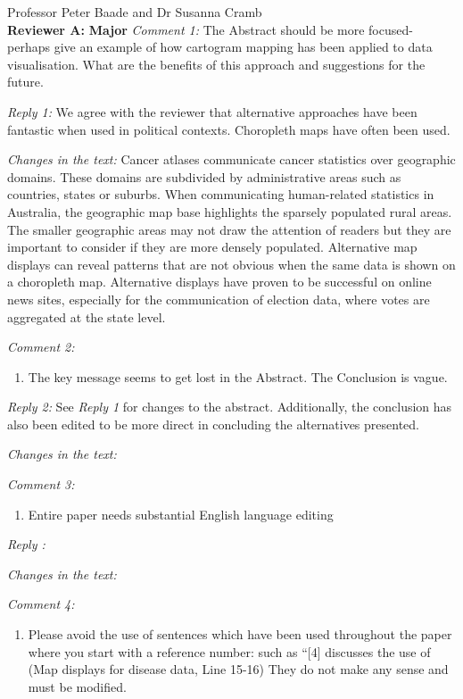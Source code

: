 \documentclass[11pt,a4paper,]{letter}
\providecommand{\tightlist}{%
  \setlength{\itemsep}{0pt}\setlength{\parskip}{0pt}}
\begin{document}
\begin{letter}{Professor Peter Baade and Dr Susanna Cramb\\}
\textbf{Reviewer A: }
\textbf{Major}
\emph{Comment 1: }
The Abstract should be more focused- perhaps give an example of how cartogram mapping has been applied to data visualisation. What are the benefits of this approach and suggestions for the future.

\emph{Reply 1:}
We agree with the reviewer that alternative approaches have been fantastic when used in political contexts. Choropleth maps have often been used.

\emph{Changes in the text:}
Cancer atlases communicate cancer statistics over geographic domains. These domains are subdivided by administrative areas such as countries, states or suburbs. When communicating human-related statistics in Australia, the geographic map base highlights the sparsely populated rural areas. The smaller geographic areas may not draw the attention of readers but they are important to consider if they are more densely populated. Alternative map displays can reveal patterns that are not obvious when the same data is shown on a choropleth map. Alternative displays have proven to be successful on online news sites, especially for the communication of election data, where votes are aggregated at the state level.

\emph{Comment 2: }

\begin{enumerate}
\def\labelenumi{\arabic{enumi}.}
\setcounter{enumi}{1}
\tightlist
\item
  The key message seems to get lost in the Abstract. The Conclusion is vague.
\end{enumerate}

\emph{Reply 2:}
See \emph{Reply 1} for changes to the abstract. Additionally, the conclusion has also been edited to be more direct in concluding the alternatives presented.

\emph{Changes in the text:}

\emph{Comment 3: }

\begin{enumerate}
\def\labelenumi{\arabic{enumi}.}
\setcounter{enumi}{2}
\tightlist
\item
  Entire paper needs substantial English language editing
\end{enumerate}

\emph{Reply :}

\emph{Changes in the text:}

\emph{Comment 4: }

\begin{enumerate}
\def\labelenumi{\arabic{enumi}.}
\setcounter{enumi}{3}
\tightlist
\item
  Please avoid the use of sentences which have been used throughout the paper where you start with a reference number: such as ``{[}4{]} discusses the use of (Map displays for disease data, Line 15-16) They do not make any sense and must be modified.
\end{enumerate}


\end{letter}
\end{document}
